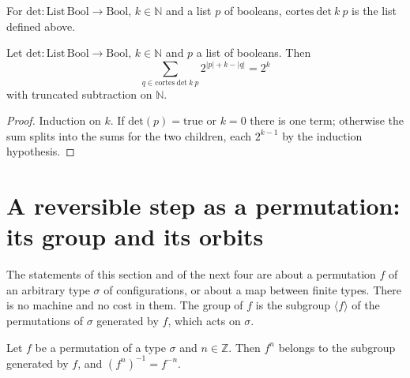 \begin{definition}
  \label{def:dynamics-cortes}
  \leanok
  For $\mathrm{det} : \mathrm{List}\,\mathrm{Bool} \to \mathrm{Bool}$, $k \in \mathbb{N}$ and a list
  $p$ of booleans, $\mathrm{cortes}\ \mathrm{det}\ k\ p$ is the list defined above.
  \own{}
\end{definition}

\begin{theorem}
  \label{thm:dynamics-kraft}
  \leanok
  Let $\mathrm{det} : \mathrm{List}\,\mathrm{Bool} \to \mathrm{Bool}$, $k \in \mathbb{N}$ and $p$ a
  list of booleans. Then
  \[
    \sum_{q \in \mathrm{cortes}\ \mathrm{det}\ k\ p} 2^{|p| + k - |q|} = 2^{k}
  \]
  with truncated subtraction on $\mathbb{N}$.
  \own{}
\end{theorem}

\begin{proof}
  \leanok
  Induction on $k$. If $\mathrm{det}(p) = \mathrm{true}$ or $k = 0$ there is one term; otherwise the
  sum splits into the sums for the two children, each $2^{k-1}$ by the induction hypothesis.
\end{proof}

\section{A reversible step as a permutation: its group and its orbits}
\label{sec:dynamics-group}

The statements of this section and of the next four are about a permutation $f$ of an arbitrary
type $\sigma$ of configurations, or about a map between finite types. There is no machine and no
cost in them. The group of $f$ is the subgroup $\langle f \rangle$ of the permutations of $\sigma$
generated by $f$, which acts on $\sigma$.

\begin{theorem}
  \label{thm:dynamics-group-steps}
  \leanok
  Let $f$ be a permutation of a type $\sigma$ and $n \in \mathbb{Z}$. Then $f^{n}$ belongs to the
  subgroup generated by $f$, and $(f^{n})^{-1} = f^{-n}$.
  \own{}
\end{theorem}

